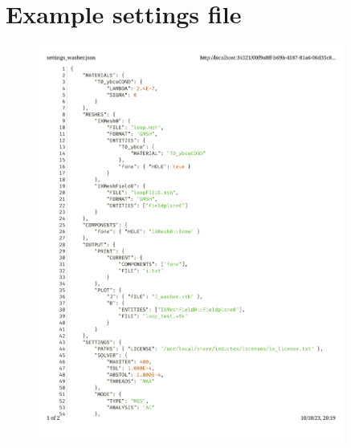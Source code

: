 \graphicspath{{appendices/}}

\chapter{Example settings file}
\makeatletter{}\makeatother
\label{appen:settings}
\begin{figure}[H]
    \centering
    \includegraphics[width=0.9\textwidth]{settings.pdf}
    \label{fig:sett1}
\end{figure}
\newpage
